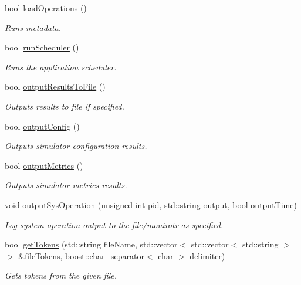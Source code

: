 \begin{DoxyCompactItemize}
bool \hyperlink{class_simulator_a19639209921d8abc828d14e319df637e}{load\+Operations} ()
\begin{DoxyCompactList}\small\item\em Runs metadata. \end{DoxyCompactList}\item 
bool \hyperlink{class_simulator_a71f3f54a1da19c9434f6f6811727691d}{run\+Scheduler} ()
\begin{DoxyCompactList}\small\item\em Runs the application scheduler. \end{DoxyCompactList}\item 
bool \hyperlink{class_simulator_a0245347cd0c75ec9d30f108d794cd7a6}{output\+Results\+To\+File} ()
\begin{DoxyCompactList}\small\item\em Outputs results to file if specified. \end{DoxyCompactList}\item 
bool \hyperlink{class_simulator_a9ddc90646b161542172481657319383d}{output\+Config} ()
\begin{DoxyCompactList}\small\item\em Outputs simulator configuration results. \end{DoxyCompactList}\item 
bool \hyperlink{class_simulator_af2c84f4f2111c69cc6608901b45e067e}{output\+Metrics} ()
\begin{DoxyCompactList}\small\item\em Outputs simulator metrics results. \end{DoxyCompactList}\item 
void \hyperlink{class_simulator_a7980ffee280efa8378e800c37686793e}{output\+Sys\+Operation} (unsigned int pid, std\+::string output, bool output\+Time)
\begin{DoxyCompactList}\small\item\em Log system operation output to the file/monirotr as specified. \end{DoxyCompactList}\item 
bool \hyperlink{class_simulator_ac46d8139df251d81fea195e6c628bd2e}{get\+Tokens} (std\+::string file\+Name, std\+::vector$<$ std\+::vector$<$ std\+::string $>$ $>$ \&file\+Tokens, boost\+::char\+\_\+separator$<$ char $>$ delimiter)
\begin{DoxyCompactList}\small\item\em Gets tokens from the given file. \end{DoxyCompactList}\item 

\end{DoxyCompactItemize}
